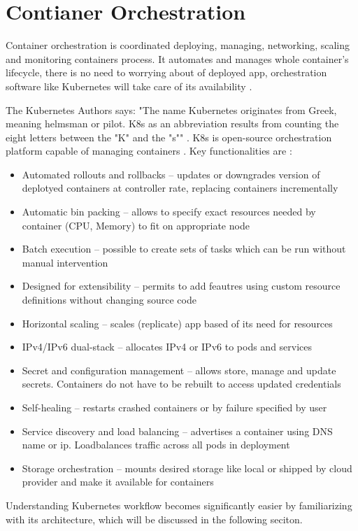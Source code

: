 
\section{Contianer Orchestration}
\label{sec:ContianerOrchestration}

Container orchestration is coordinated deploying, managing, networking, scaling and monitoring containers process. It automates and manages whole container's lifecycle, there is no need to worrying about of deployed app, orchestration software like Kubernetes will take care of its availability \cite{RedhatContainerization}.

The Kubernetes Authors says: "The name Kubernetes originates from Greek, meaning helmsman or pilot. K8s as an abbreviation results from counting the eight letters between the "K" and the "s"" \cite{KubernetesDocs}. K8s is open-source orchestration platform capable of managing containers \cite{KubernetesDocs}. Key functionalities are \cite{KubernetesDocs}:

\begin{itemize}
    \item Automated rollouts and rollbacks -- updates or downgrades version of deplotyed containers at controller rate, replacing containers incrementally
    \item Automatic bin packing --  allows to specify exact resources needed by container (CPU, Memory) to fit on appropriate node
    \item Batch execution -- possible to create sets of tasks which can be run without manual intervention
    \item Designed for extensibility -- permits to add feautres using custom resource definitions without changing source code
    \item Horizontal scaling -- scales (replicate) app based of its need for resources
    \item IPv4/IPv6 dual-stack -- allocates IPv4 or IPv6 to pods and services
    \item Secret and configuration management -- allows store, manage and update secrets. Containers do not have to be rebuilt to access updated  credentials
    \item Self-healing -- restarts crashed containers or by failure specified by user
    \item Service discovery and load balancing -- advertises a container using DNS name or ip. Loadbalances traffic across all pods in deployment
    \item Storage orchestration -- mounts desired storage like local or shipped by cloud provider and make it available for containers
\end{itemize}
Understanding Kubernetes workflow becomes significantly easier by familiarizing with its architecture, which will be discussed in the following seciton.


